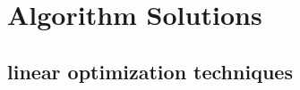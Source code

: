 \documentclass{article}%
\begin{document}
%
\section{Algorithm Solutions}%
\label{sec:AlgorithmSolutions}%
\begin{itemize}[leftmargin=*]%
\subsection{linear optimization techniques}%
\label{subsec:linearoptimizationtechniques}%
\begin{itemize}[leftmargin=*]%
%
\end{itemize}

%
\end{itemize}%
\newpage

%
\end{document}
